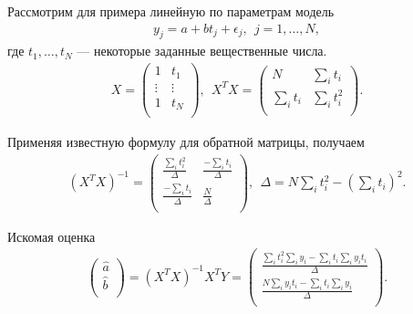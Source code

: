 \documentclass[10pt,slidestop,usepdftitle=false]{beamer}
\begin{document}
\begin{frame}
Рассмотрим для примера линейную по параметрам модель
\begin{eqnarray*}
y_j = a +
bt_j+\epsilon_j,\ \ j=1,\ldots, N,
\end{eqnarray*}
где $t_1,\ldots,t_N$ --- некоторые заданные вещественные числа.
\begin{eqnarray*}
X= \left( \begin{array}{cc}
          1 & t_1 \\
          \vdots & \vdots \\
          1 & t_N \\
          \end{array}
          \right), \ \ X^TX= \left( \begin{array}{cc}
          N & \sum_{i}t_i \\
          \sum_{i}t_i & \sum_{i}t_i^2 \\
          \end{array}
          \right).
\end{eqnarray*}

\pause
Применяя известную формулу для обратной матрицы, получаем
\begin{eqnarray*}
(X^TX)^{-1}= \left( \begin{array}{cc}
          \frac{\sum_{i}t_i^2}{\Delta}  &\frac{ -\sum_{i}t_i}{\Delta} \\
         \frac{ -\sum_{i}t_i}{\Delta} & \frac{N}{\Delta} \\
          \end{array}
          \right),\ \ \Delta= N\sum_{i}t_i^2-\left(\sum_{i}t_i\right)^2.
\end{eqnarray*}

\pause
 
Искомая оценка
\begin{eqnarray*}
      \left(
       \begin{array}{c}
         \widehat{a} \\
         \widehat{b} \\
       \end{array}
              \right)=(X^TX)^{-1}X^TY=\left(
                              \begin{array}{c}
                                \frac{\sum_{i}t_i^2\sum_{i}y_i-\sum_{i}t_i\sum_{i}y_it_i}{\Delta} \\
                                \frac{N\sum_{i}y_it_i-\sum_{i}t_i\sum_{i}y_i}{\Delta} \\
                              \end{array}
                            \right).
\end{eqnarray*}

\end{frame}
\end{document}
